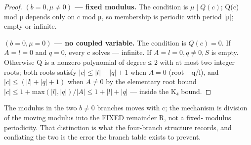 \begin{proof}
\textbf{$(b = 0, μ ≠ 0)$ — fixed modulus.} The condition is $μ ∣ Q(c)$; Q(c) mod μ depends only on c mod μ, so membership is periodic with period |μ|; empty or infinite.

\textbf{$(b = 0, μ = 0)$ — no coupled variable.} The condition is $Q(c) = 0$. If $A = l = 0$ and $q = 0$, every c solves — infinite. If $A = l = 0, q ≠ 0, S$ is empty. Otherwise Q is a nonzero polynomial of degree ≤ 2 with at most two integer roots; both roots satisfy $|c| ≤ |l| + |q| + 1$ when $A = 0$ (root −q/l), and $|c| ≤ (|l|+|q|+1)$ when $A ≠ 0$ by the elementary root bound $|c| ≤ 1 + \mathrm{max}(|l|,|q|)/|A| ≤ 1 + |l| + |q|$ — inside the K₄ bound.

\end{proof}
The modulus in the two $b ≠ 0$ branches moves with c; the mechanism is division of the moving modulus into the FIXED remainder R, not a fixed- modulus periodicity. That distinction is what the four-branch structure records, and conflating the two is the error the branch table exists to prevent.

